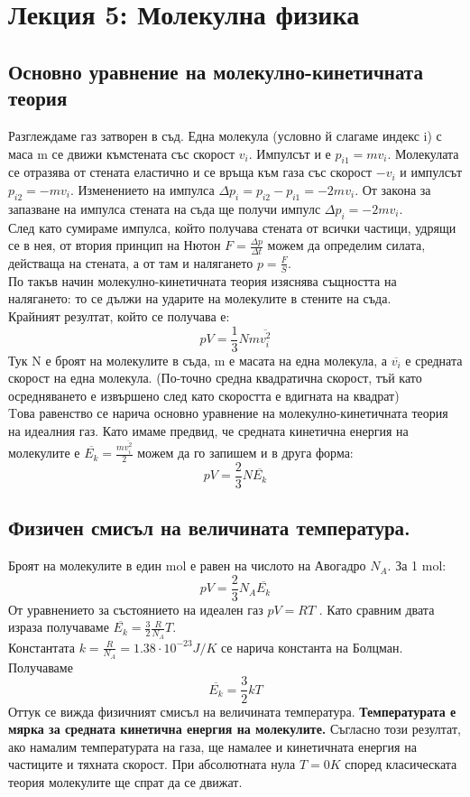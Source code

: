 \documentclass[fleqn, 12pt]{article}
\theoremstyle{definition}
\begin{document}
\newpage
\section{Лекция 5: Молекулна физика}

\subsection{Основно уравнение на молекулно-кинетичната теория}
Разглеждаме газ затворен в съд. Една молекула
(условно й слагаме индекс i) с маса m се движи къмстената със скорост $v_i$. 
Импулсът и е $p_{i1} = mv_i$. Молекулата се отразява от стената еластично и се връща към газа със скорост $- v_i$
и импулсът $p_{i2} = -mv_i$. Изменението на импулса $\Delta p_i = p_{i2} - p_{i1} = -2mv_i$.
От закона за запазване на импулса стената на съда ще получи импулс $\Delta p_i = -2mv_i$.\\
След като сумираме импулса, който получава стената от всички частици, удрящи се в нея, от втория принцип на Нютон
$F = \frac{\Delta p}{\Delta t}$ можем да определим силата, действаща на стената, а от там и налягането $p = \frac{F}{S}$. \\ 
По такъв начин молекулно-кинетичната теория изяснява същността на налягането: 
то се дължи на ударите на молекулите в стените на съда. \\
Крайният резултат, който се получава е:
$$pV = \frac{1}{3} Nm \overline{v_i^2}$$
Тук N е броят на молекулите в съда, m е масата на една молекула, а $\overline{v_i}$ е
средната скорост на една молекула. (По-точно средна квадратична скорост, тъй като
осредняването е извършено след като скоростта е вдигната на квадрат) \\
Tова равенство се нарича основно уравнение на молекулно-кинетичната теория
на идеалния газ. Като имаме предвид, че средната кинетична енергия на молекулите е $\overline{E_k} = \frac{m\overline{v_i^2}}{2}$ можем да го запишем и в друга форма:
$$pV = \frac{2}{3} N \overline{E_k}$$

\subsection{Физичен смисъл на величината температура.}
Броят на молекулите в един mol е равен на числото на Авогадро $N_A$. За 1 mol:
$$pV = \frac{2}{3} N_A \overline{E_k}$$
От уравнението за състоянието на идеален газ $pV = RT$ . Като сравним двата израза получаваме $\overline{E_k} = \frac{3}{2} \frac{R}{N_A}T$. \\
Константата $k = \frac{R}{N_A} = 1.38 \cdot 10^{-23} J/K $ се нарича константа на Болцман. 
Получаваме 
$$\overline{E_k} = \frac{3}{2}kT$$
Оттук се вижда физичният смисъл на величината температура. \textbf{Температурата
е мярка за средната кинетична енергия на молекулите.} Съгласно този резултат, ако
намалим температурата на газа, ще намалее и кинетичната енергия на частиците и
тяхната скорост. При абсолютната нула $T = 0K$ според класическата теория молекулите ще спрат да се движат.
\end{document}
